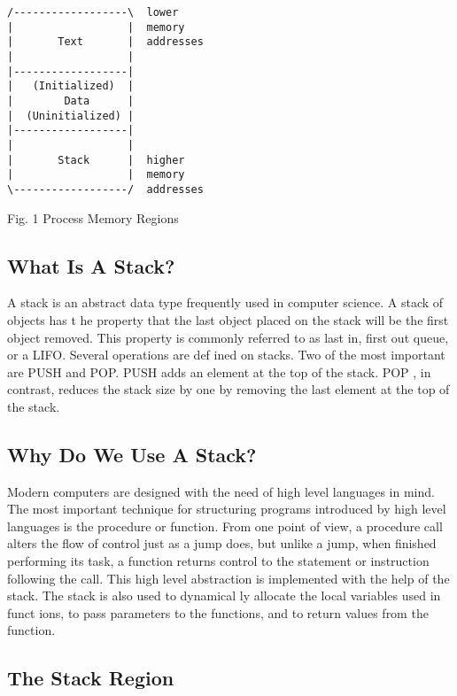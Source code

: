\documentclass[10pt]{article}
\begin{document}
\begin{lstlisting}[caption=Process Memory Regions]
/------------------\  lower
|                  |  memory
|       Text       |  addresses
|                  |
|------------------|
|   (Initialized)  |
|        Data      |
|  (Uninitialized) |
|------------------|
|                  |
|       Stack      |  higher
|                  |  memory
\------------------/  addresses
\end{lstlisting}

Fig. 1 Process Memory Regions

\subsection{What Is A Stack?}

A stack is an abstract data type frequently used in computer science.  A stack of objects has t he property that the 
last object placed on the stack will be the first object removed. This property is commonly referred to as last in, 
first out queue, or a LIFO. Several operations are def ined on stacks. Two of the most important are PUSH and 
POP. PUSH adds an element at the top of the stack. POP , in contrast, reduces the stack size by one by removing 
the last element at the top of the stack.

\subsection{Why Do We Use A Stack?}

Modern computers are designed with the need of high level languages in mind. The most important technique 
for structuring programs introduced by high level languages is the procedure or function. From one point of 
view, a procedure call alters the flow of control just as a jump does, but unlike a jump, when finished 
performing its task, a function returns control to the statement or instruction following the call. This high level 
abstraction is implemented with the help of the stack. The stack is also used to dynamical ly allocate the local 
variables used in funct ions, to pass parameters to the functions, and to return values from the function.

\subsection{The Stack Region}
\end{document}
